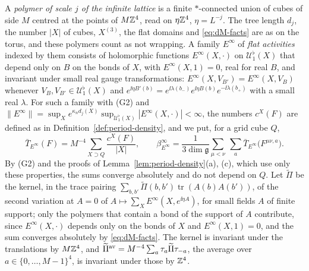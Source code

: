 A \emph{polymer of scale $j$ of the infinite lattice} is a finite $*$-connected union of cubes of side $M$ centred at the points of $M\mathbb Z^4$, read on $\eta\mathbb Z^4$, $\eta=L^{-j}$. The tree length $d_j$, the number $|X|$ of cubes, $X^{(3)}$, the flat domains and \eqref{eq:dM-facts} are as on the torus, and these polymers count as not wrapping. A family $E^\infty$ of \emph{flat activities} indexed by them consists of holomorphic functions $E^\infty(X,\cdot)$ on $\mathcal U^\flat_1(X)$ that depend only on $B$ on the bonds of $X$, with $E^\infty(X,1)=0$, real for real $B$, and invariant under small real gauge transformations: $E^\infty(X,V_{B'})=E^\infty(X,V_B)$ whenever $V_B,V_{B'}\in\mathcal U^\flat_1(X)$ and $e^{\ii\eta B'(b)}=e^{\ii\lambda(b_-)}e^{\ii\eta B(b)}e^{-\ii\lambda(b_+)}$ with a small real $\lambda$. For such a family with (G2) and $\|E^\infty\|=\sup_Xe^{\kappa_nd_j(X)}\sup_{\mathcal U^\flat_1(X)}|E^\infty(X,\cdot)|<\infty$, the numbers $c^X(F)$ are defined as in Definition~\ref{def:period-density}, and we put, for a grid cube $Q$,
\[
\bar T_{E^\infty}(F)=M^{-4}\sum_{X\supset Q}\frac{c^X(F)}{|X|},\qquad\beta^\infty_{E^\infty}=\frac1{3\dim\mathfrak g}\sum_{\mu<\nu}\ \sum_a\bar T_{E^\infty}\big(F^{\mu\nu,a}\big).
\]
By (G2) and the proofs of Lemma~\ref{lem:period-density}(a), (c), which use only these properties, the sums converge absolutely and do not depend on $Q$. Let $\widetilde\Pi$ be the kernel, in the trace pairing $\sum_{b,b'}\widetilde\Pi(b,b')\operatorname{tr}(A(b)A(b'))$, of the second variation at $A=0$ of $A\mapsto\sum_XE^\infty(X,e^{\ii\eta A})$, for small fields $A$ of finite support; only the polymers that contain a bond of the support of $A$ contribute, since $E^\infty(X,\cdot)$ depends only on the bonds of $X$ and $E^\infty(X,1)=0$, and the sum converges absolutely by \eqref{eq:dM-facts}. The kernel is invariant under the translations by $M\mathbb Z^4$, and $\widetilde\Pi^{\rm av}=M^{-4}\sum_a\tau_a\widetilde\Pi\tau_{-a}$, the average over $a\in\{0,\dots,M-1\}^4$, is invariant under those by $\mathbb Z^4$.


